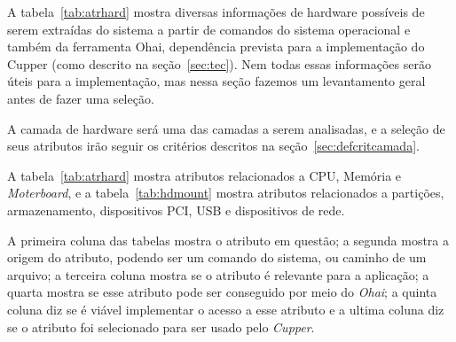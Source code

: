 A tabela~\ref{tab:atrhard} mostra diversas informações de hardware possíveis de serem extraídas
do sistema a partir de comandos do sistema operacional e também da ferramenta Ohai, 
dependência prevista para a implementação do Cupper (como descrito na 
seção~\ref{sec:tec}). Nem todas essas informações serão úteis para a 
implementação, mas nessa seção fazemos um levantamento geral antes de fazer uma
seleção.

A camada de hardware será uma das camadas a serem analisadas, e a seleção de 
seus atributos irão seguir os critérios descritos na seção~\ref{sec:defcritcamada}.

A tabela~\ref{tab:atrhard} mostra atributos relacionados a CPU, Memória e 
\textit{Moterboard}, e a tabela~\ref{tab:hdmount} mostra atributos relacionados
a partições, armazenamento, dispositivos PCI, USB e dispositivos de rede.

A primeira coluna das tabelas mostra o atributo em questão; a segunda mostra
a origem do atributo, podendo ser um comando do sistema, ou caminho de um arquivo;
a terceira coluna mostra se o atributo é relevante para a aplicação; a quarta mostra se
esse atributo pode ser conseguido por meio do \textit{Ohai}; a quinta coluna 
diz se é viável implementar o acesso a esse atributo e a ultima coluna
diz se o atributo foi selecionado para ser usado pelo \textit{Cupper}.

